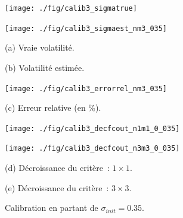 \pagebreak

\begin{figure}[!htbp]

\begin{center}
\begin{minipage}{5.8cm}
\centerline{\texttt{[image: ./fig/calib3\_sigmatrue]}
} 
\end{minipage}
\hspace*{0.1cm}
\begin{minipage}{5.8cm}
\centerline{\texttt{[image: ./fig/calib3\_sigmaest\_nm3\_035]}
}
\end{minipage}
\end{center}

\begin{center}
\begin{minipage}{5.8cm}
(a) Vraie volatilit\'e.
\end{minipage}
\hspace*{0.1cm}
\begin{minipage}{5.8cm}
(b) Volatilit\'e estim\'ee.
\end{minipage}
\end{center}

\medskip

\begin{center}
\begin{minipage}{5.8cm}
\centerline{\texttt{[image: ./fig/calib3\_errorrel\_nm3\_035]}
}
\end{minipage}
\end{center}

\begin{center}
\begin{minipage}{5.8cm}
(c) Erreur relative (en \%).
\end{minipage}
\end{center}

\medskip

\begin{center}
\begin{minipage}{5.8cm}
\centerline{\texttt{[image: ./fig/calib3\_decfcout\_n1m1\_0\_035]}
}
\end{minipage}
\hspace*{0.1cm}
\begin{minipage}{5.8cm}
\centerline{\texttt{[image: ./fig/calib3\_decfcout\_n3m3\_0\_035]}
}
\end{minipage}
\end{center}

\begin{center}
\begin{minipage}{5.8cm}
(d) D\'ecroissance du crit\`ere~: $1 \times 1$.
\end{minipage}
\hspace*{0.1cm}
\begin{minipage}{5.8cm}
(e) D\'ecroissance du crit\`ere~: $3 \times 3$.
\end{minipage}
\end{center}

\caption{Calibration en partant de $\sigma_{init} = 0.35$.}
\label{FIG:CALIB3_NM3_035}
\end{figure}

